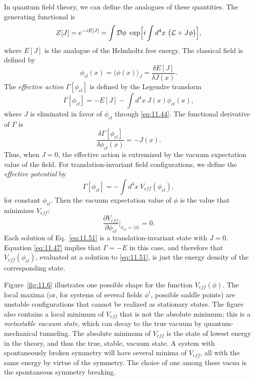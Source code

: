In quantum field theory, we can define the analogues of these quantities.  The
generating functional is
\begin{equation}
  Z[J] = e^{-iE[J]} = \int \mathcal{D}\phi\ \exp\Bigl[ i\int d^4x\
    \bigl( \mathcal{L} + J\phi \bigr) \Bigr] ,
  \label{eq:11.43}
\end{equation}
where $E[J]$ is the analogue of the Helmholtz free energy.  The classical
field is defined by
\begin{equation}
  \phi_{cl}(x) = \langle\phi(x)\rangle_J = \frac{\delta E[J]}
    {\delta J(x)} .
  \label{eq:11.44}
\end{equation}
The \emph{effective action} $\Gamma[\phi_{cl}]$ is defined by the Legendre
transform
\begin{equation}
  \Gamma[\phi_{cl}] = -E[J] - \int d^4x\ J(x)\phi_{cl}(x) ,
  \label{eq:11.47}
\end{equation}
where $J$ is eliminated in favor of $\phi_{cl}$ through \eqref{eq:11.44}.
The functional derivative of $\Gamma$ is
\begin{equation}
  \frac{\delta\Gamma[\phi_{cl}]}{\delta\phi_{cl}(x)} = -J(x) .
  \label{eq:11.48}
\end{equation}
Thus, when $J = 0$, the effective action is extremized by the vacuum
expectation value of the field.  For translation-invariant field
configurations, we define the \emph{effective potential} by
\begin{equation}
  \Gamma[\phi_{cl}] = -\int d^4x\ V_{eff}(\phi_{cl}) ,
  \label{eq:11.50}
\end{equation}
for constant $\phi_{cl}$.  Then the vacuum expectation value of $\phi$ is the
value that minimizes $V_{eff}$:
\begin{equation}
  \frac{\partial V_{eff}}{\partial\phi_{cl}}\Big|_{\phi_{cl} =
    \langle\phi\rangle} = 0 .
  \label{eq:11.51}
\end{equation}
Each solution of Eq.~\eqref{eq:11.51} is a translation-invariant state with
$J = 0$.  Equation \eqref{eq:11.47} implies that $\Gamma = -E$ in this case,
and therefore that $V_{eff}(\phi_{cl})$, evaluated at a solution to
\eqref{eq:11.51}, is just the energy density of the corresponding state.

Figure~\ref{fig:11.6} illustrates one possible shape for the function
$V_{eff}(\phi)$.  The local maxima (or, for systems of several fields
$\phi^i$, possible saddle points) are unstable configurations that cannot be
realized as stationary states.  The figure also contains a local minimum of
$V_{eff}$ that is not the absolute minimum; this is a \emph{metastable vacuum
state}, which can decay to the true vacuum by quantum-mechanical tunneling.
The absolute minimum of $V_{eff}$ is the state of lowest energy in the
theory, and thus the true, stable, vacuum state.  A system with spontaneously
broken symmetry will have several minima of $V_{eff}$, all with the same
energy by virtue of the symmetry.  The choice of one among these vacua is the
spontaneous symmetry breaking.

